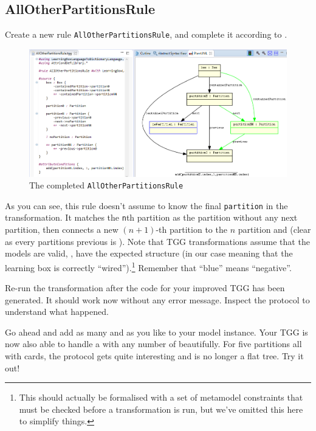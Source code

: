 \newpage
\hypertarget{allCards vis}{}
\subsection{AllOtherPartitionsRule}
\genHeader

\begin{stepbystep}

\item Create a new rule \texttt{AllOtherPartitionsRule}, and complete it according to .


\begin{figure}[htbp]
\begin{center}
  \includegraphics[width=\textwidth]{../../org.moflon.doc.handbook.04_tripleGraphTransformations/6_extendingTransformation/visProtoImages/ea_AllOtherPartitionsRule}
  \caption{The completed \texttt{AllOtherPartitionsRule}}
  \label{fig:ea_AllOtherPartitionsRuleComplete}
\end{center}
\end{figure}

\item As you can see, this rule doesn't assume to know the final \texttt{partition} in the transformation. 
It matches the \texttt{n}th partition as the partition without any next partition, then connects a new $(n+1)$-th partition to the $n$ partition and  (clear as every partitions previous is ).
Note that TGG transformations assume that the models are valid, \idest, have the expected structure (in our case meaning that the learning box is correctly \enquote{wired}).\footnote{This should actually be formalised with a set of metamodel constraints that must be checked before a transformation is run, but we've omitted this here to simplify things.}  
Remember that \enquote{blue} means \enquote{negative}.

\item Re-run the transformation after the code for your improved TGG has been generated. 
It should work now without any error message.
Inspect the protocol to understand what happened.

\item Go ahead and add as many  and  as you like to your model instance.
Your TGG is now also able to handle a  with any number of  beautifully.
For five partitions all with cards, the protocol gets quite interesting and is no longer a flat tree.
Try it out! 

\end{stepbystep}
